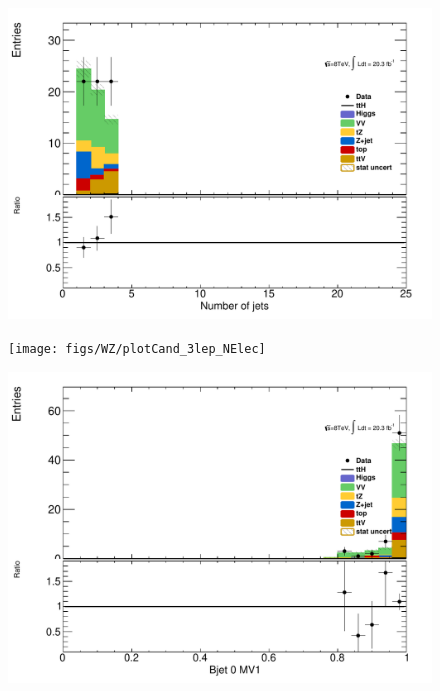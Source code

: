 \begin{figure}[!htbp]

  \begin{minipage}[h]{0.5\textwidth}
    \centering \includegraphics[width=\textwidth]{figs/WZ/wz_b_NJet}
  \end{minipage}\hfill
  \begin{minipage}[h]{0.5\textwidth}
    \centering \texttt{[image: figs/WZ/plotCand\_3lep\_NElec]}
  \end{minipage}\hfill
  \begin{minipage}[h]{0.5\textwidth}
    \centering \includegraphics[width=\textwidth]{figs/WZ/plotCand_3lep_VVb_BJet0MV1}
  \end{minipage}\hfill
  \begin{minipage}[h]{0.5\textwidth}

\end{minipage}
\end{figure}
